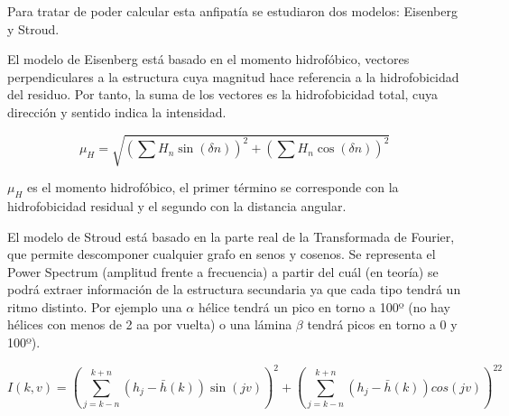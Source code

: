 \documentclass[a4paper,11pt]{report}
\begin{document}
 Para tratar de poder calcular esta anfipatía se estudiaron dos modelos: Eisenberg y Stroud.
 
 El modelo de Eisenberg está basado en el momento hidrofóbico, vectores perpendiculares a la estructura cuya magnitud hace referencia a la hidrofobicidad del residuo. Por tanto, la suma de los vectores es la hidrofobicidad total, cuya dirección y sentido indica la intensidad.
 
 \begin{equation}
 	\mu_H =\sqrt{(\sum H_n\sin(\delta n))^2+(\sum H_n \cos(\delta n))^2}
 \end{equation}
 
 $\mu_H$ es el momento hidrofóbico, el primer término se corresponde con la hidrofobicidad residual y el segundo con la distancia angular.
 
 El modelo de Stroud está basado en la parte real de la Transformada de Fourier, que permite descomponer cualquier grafo en senos y cosenos. Se representa el Power Spectrum (amplitud frente a frecuencia) a partir del cuál (en teoría) se podrá extraer información de la estructura secundaria ya que cada tipo tendrá un ritmo distinto. Por ejemplo una $\alpha$ hélice tendrá un pico en torno a 100º (no hay hélices con menos de 2 aa por vuelta) o una lámina $\beta$ tendrá picos en torno a 0 y 100º).
 
 \begin{equation}
 	I (k, v) =(\sum_{j=k-n}^{k+n} (h_j- \bar{h}(k))\sin(jv))^2 + (\sum_{j=k-n}^{k+n} (h_j- \bar{h}(k))cos(jv))^22
 \end{equation}
 
\end{document}

